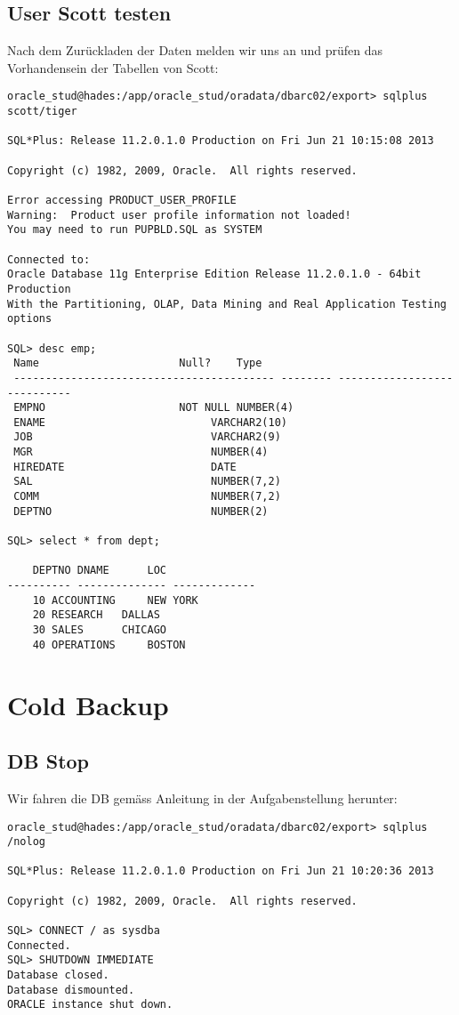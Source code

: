\documentclass[11pt,a4paper,parskip=half]{scrartcl}
\begin{document}
\subsection{User Scott testen}
Nach dem Zurückladen der Daten melden wir uns an und prüfen das Vorhandensein der Tabellen von Scott:
\begin{lstlisting}
oracle_stud@hades:/app/oracle_stud/oradata/dbarc02/export> sqlplus scott/tiger

SQL*Plus: Release 11.2.0.1.0 Production on Fri Jun 21 10:15:08 2013

Copyright (c) 1982, 2009, Oracle.  All rights reserved.

Error accessing PRODUCT_USER_PROFILE
Warning:  Product user profile information not loaded!
You may need to run PUPBLD.SQL as SYSTEM

Connected to:
Oracle Database 11g Enterprise Edition Release 11.2.0.1.0 - 64bit Production
With the Partitioning, OLAP, Data Mining and Real Application Testing options

SQL> desc emp;
 Name					   Null?    Type
 ----------------------------------------- -------- ----------------------------
 EMPNO					   NOT NULL NUMBER(4)
 ENAME						    VARCHAR2(10)
 JOB						    VARCHAR2(9)
 MGR						    NUMBER(4)
 HIREDATE					    DATE
 SAL						    NUMBER(7,2)
 COMM						    NUMBER(7,2)
 DEPTNO 					    NUMBER(2)

SQL> select * from dept;

    DEPTNO DNAME	  LOC
---------- -------------- -------------
	10 ACCOUNTING	  NEW YORK
	20 RESEARCH	  DALLAS
	30 SALES	  CHICAGO
	40 OPERATIONS	  BOSTON

\end{lstlisting}


\newpage
\section{Cold Backup}
\subsection{DB Stop}
Wir fahren die DB gemäss Anleitung in der Aufgabenstellung herunter:
\begin{lstlisting}
oracle_stud@hades:/app/oracle_stud/oradata/dbarc02/export> sqlplus /nolog

SQL*Plus: Release 11.2.0.1.0 Production on Fri Jun 21 10:20:36 2013

Copyright (c) 1982, 2009, Oracle.  All rights reserved.

SQL> CONNECT / as sysdba
Connected.
SQL> SHUTDOWN IMMEDIATE
Database closed.
Database dismounted.
ORACLE instance shut down.
\end{lstlisting}
\end{document}
